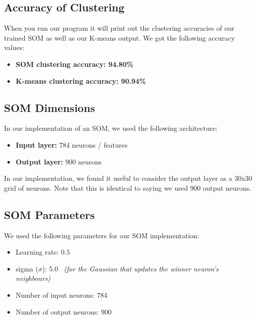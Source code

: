 \documentclass[11pt]{article}
\providecommand{\tightlist}{%
  \setlength{\itemsep}{0pt}\setlength{\parskip}{0pt}}
\begin{document}
\subsection{Accuracy of Clustering}\label{accuracy-of-clustering}

When you run our program it will print out the clustering accuracies of
our trained SOM as well as our K-means output. We got the following
accuracy values:

\begin{itemize}
	\tightlist
	\item \textbf{SOM clustering accuracy: 94.80\%}
	\item \textbf{K-means clustering accuracy: 90.94\%}
\end{itemize}

    \subsection{SOM Dimensions}\label{som-dimensions}

In our implementation of an SOM, we used the following architecture:

\begin{itemize}
\tightlist
\item
  \textbf{Input layer:} 784 neurons / features
\item
  \textbf{Output layer:} 900 neurons
\end{itemize}

In our implementation, we found it useful to consider the output layer
as a 30x30 grid of neurons. Note that this is identical to saying we
used 900 output neurons.

    \subsection{SOM Parameters}\label{som-parameters}

We used the following parameters for our SOM implementation:

\begin{itemize}
	\tightlist
	\item Learning rate: $0.5$
	\item sigma (\(\sigma\)): 5.0 \ \textit{(for the Gaussian that updates the winner neuron's neighbours)}
	\item Number of input neurons: 784
	\item Number of output neurons: 900
\end{itemize}
\end{document}
